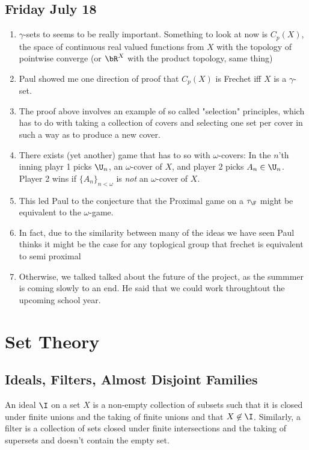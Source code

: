 \documentclass{article}
\begin{document}
\subsection*{Friday July 18}
\begin{enumerate}
    \item \(\gamma\)-sets to seems to be really important. Something to look at now is \(C_p(X)\), the space of continuous real valued functions from \(X\) with the topology of pointwise converge (or \(\bR^X\) with the product topology, same thing)
    \item Paul showed me one direction of proof that \(C_p(X)\) is Frechet iff \(X\) is a \(\gamma\)-set.
    \item The proof above involves an example of so called "selection" principles, which has to do with taking a collection of covers and selecting one set per cover in such a way as to produce a new cover. 
    \item There exists (yet another) game that has to so with \(\omega\)-covers: In the \(n\)'th inning playr 1 picks \(\U_n\), an \(\omega\)-cover of \(X\), and player 2 picks \(A_n \in \U_n\). Player 2 wins if \(\{A_n\}_{n < \omega}\) is \textit{not} an \(\omega\)-cover of \(X\). 
    \item This led Paul to the conjecture that the Proximal game on a \(\tau_{\F}\) might be equivalent to the \(\omega\)-game.
    \item In fact, due to the similarity between many of the ideas we have seen Paul thinks it might be the case for any toplogical group that frechet is equivalent to semi proximal
    \item Otherwise, we talked talked about the future of the project, as the summmer is coming slowly to an end. He said that we could work throughtout the upcoming school year.
\end{enumerate}

\newpage
\section{Set Theory}

\subsection{Ideals, Filters, Almost Disjoint Families}

An ideal \(\I\) on a set \(X\) is a non-empty collection of subsets such that it is closed under finite unions and the taking of finite unions and that \(X \not\in \I\). Similarly, a filter is a collection of sets closed under finite intersections and the taking of supersets and doesn't contain the empty set. 
\end{document}
